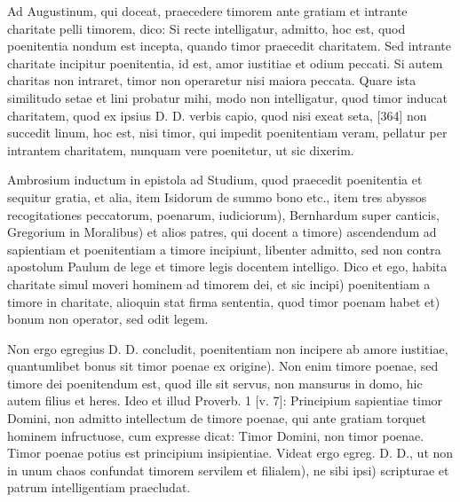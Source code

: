 Ad Augustinum, qui doceat, praecedere timorem ante gratiam et intrante charitate pelli timorem, dico: Si recte intelligatur, admitto, hoc est, quod poenitentia nondum est incepta, quando timor praecedit charitatem. Sed intrante charitate incipitur poenitentia, id est, amor iustitiae et odium peccati. Si autem charitas non intraret, timor non operaretur nisi maiora peccata. Quare ista similitudo setae et lini probatur mihi, modo non intelligatur, quod timor inducat charitatem, quod ex ipsius D. D. verbis capio, quod nisi exeat seta, [364] non succedit linum, hoc est, nisi timor, qui impedit poenitentiam veram, pellatur per intrantem charitatem, nunquam vere poenitetur, ut sic dixerim.

Ambrosium inductum in epistola ad Studium, quod praecedit poenitentia et sequitur gratia, et alia, item Isidorum de summo bono etc., item tres abyssos recogitationes peccatorum, poenarum, iudiciorum), Bernhardum super canticis, Gregorium in Moralibus) et alios patres, qui docent a timore) ascendendum ad sapientiam et poenitentiam a timore incipiunt, libenter admitto, sed non contra apostolum Paulum de lege et timore legis docentem intelligo. Dico et ego, habita charitate simul moveri hominem ad timorem dei, et sic incipi) poenitentiam a timore in charitate, alioquin stat firma sententia, quod timor poenam habet et) bonum non operator, sed odit legem.

Non ergo egregius D. D. concludit, poenitentiam non incipere ab amore iustitiae, quantumlibet bonus sit timor poenae ex origine). Non enim timore poenae, sed timore dei poenitendum est, quod ille sit servus, non mansurus in domo, hic autem filius et heres. Ideo et illud Proverb. 1 [v. 7]: Principium sapientiae timor Domini, non admitto intellectum de timore poenae, qui ante gratiam torquet hominem infructuose, cum expresse dicat: Timor Domini, non timor poenae. Timor poenae potius est principium insipientiae. Videat ergo egreg. D. D., ut non in unum chaos confundat timorem servilem et filialem), ne sibi ipsi) scripturae et patrum intelligentiam praecludat.

